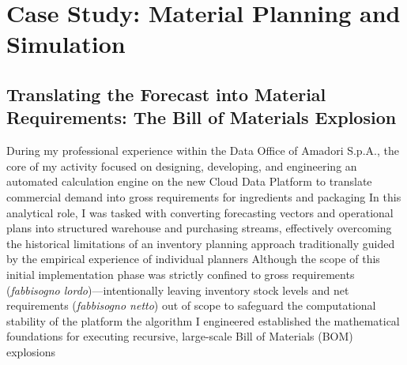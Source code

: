 \chapter{Case Study: Material Planning and Simulation}
\label{chap:casestudy}
\section[The Bill of Materials Explosion]{Translating the Forecast into Material Requirements: The Bill of Materials Explosion}

During my professional experience within the Data Office of Amadori S.p.A., the core of my activity focused on designing, developing, and engineering an automated calculation engine on the new Cloud Data Platform to translate commercial demand into gross requirements for ingredients and packaging %
In this analytical role, I was tasked with converting forecasting vectors and operational plans into structured warehouse and purchasing streams, effectively overcoming the historical limitations of an inventory planning approach traditionally guided by the empirical experience of individual planners %
Although the scope of this initial implementation phase was strictly confined to gross requirements (\textit{fabbisogno lordo})—intentionally leaving inventory stock levels and net requirements (\textit{fabbisogno netto}) out of scope to safeguard the computational stability of the platform %
the algorithm I engineered established the mathematical foundations for executing recursive, large-scale Bill of Materials (BOM) explosions %


